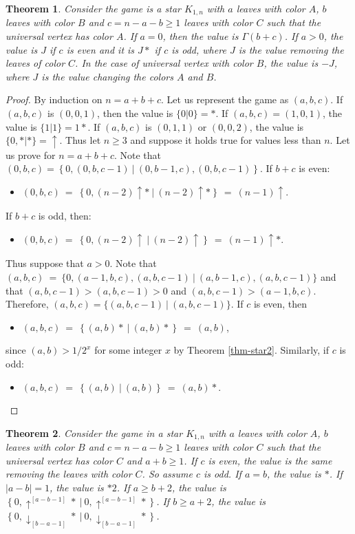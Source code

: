 \documentclass[a4paper,11pt]{article}
\newtheorem{theorem}{Theorem}
\begin{document}
\begin{theorem}\label{thm-star4}
Consider the game is a star $K_{1,n}$ with $a$ leaves with color $A$, $b$ leaves with color $B$ and $c=n-a-b\geq 1$ leaves with color $C$ such that the universal vertex has color $A$.
If $a=0$, then the value is $\Gamma(b+c)$. If $a>0$, the value is $J$ if $c$ is even and it is $J*$ if $c$ is odd, where $J$ is the value removing the leaves of color $C$.
In the case of universal vertex with color $B$, the value is $-J$, where $J$ is the value changing the colors $A$ and $B$.
\end{theorem}

\begin{proof}
By induction on $n=a+b+c$. Let us represent the game as $(a,b,c)$.
If $(a,b,c)$ is $(0,0,1)$, then the value is $\{0|0\}=*$.
If $(a,b,c)=(1,0,1)$, the value is $\{1|1\}=1*$.
If $(a,b,c)$ is $(0,1,1)$ or $(0,0,2)$, the value is $\{0,*|*\}=\uparrow$.
Thus let $n\geq 3$ and suppose it holds true for values less than $n$. Let us prove for $n=a+b+c$.
Note that $(0,b,c)=\left\{0,(0,b,c-1)\ \big|\ (0,b-1,c),(0,b,c-1)\right\}$. 
If $b+c$ is even:
\begin{itemize}
\item $(0,b,c)\ =\ \left\{0,(n-2)\uparrow *\ \big|\ (n-2)\uparrow *\right\}\ =\ (n-1)\uparrow$.
\end{itemize}
If $b+c$ is odd, then:
\begin{itemize}
\item $(0,b,c)\ =\ \left\{0,(n-2)\uparrow\ \big|\ (n-2)\uparrow\right\}\ =\ (n-1)\uparrow *$.
\end{itemize}
Thus suppose that $a>0$. Note that $(a,b,c)\ =\ \{0,(a-1,b,c),(a,b,c-1)\ \big|\ (a,b-1,c),(a,b,c-1)\}$ and that $(a,b,c-1)>(a,b,c-1)>0$ and $(a,b,c-1)>(a-1,b,c)$. Therefore, $(a,b,c)=\{(a,b,c-1)\ |\ (a,b,c-1)\}$. If $c$ is even, then
\begin{itemize}
\item $(a,b,c)\ =\ \left\{(a,b)*\ \big|\ (a,b)*\right\}\ =\ (a,b)$,
\end{itemize}
since $(a,b)>1/2^x$ for some integer $x$ by Theorem \ref{thm-star2}.
Similarly, if $c$ is odd:
\begin{itemize}
\item $(a,b,c)\ =\ \left\{(a,b)\ \big|\ (a,b)\right\}\ =\ (a,b)*$.
\end{itemize}

\end{proof}

\begin{theorem}\label{thm-star5}
Consider the game in a star $K_{1,n}$ with $a$ leaves with color $A$, $b$ leaves with color $B$ and $c=n-a-b\geq 1$ leaves with color $C$ such that the universal vertex has color $C$ and $a+b\geq 1$.
If $c$ is even, the value is the same removing the leaves with color $C$.
So assume $c$ is odd.
If $a=b$, the value is $*$. If $|a-b|=1$, the value is $*2$.
If $a\geq b+2$, the value is $\left\{0,\uparrow^{[a-b-1]}*\ \big|\ 0,\uparrow^{[a-b-1]}*\right\}$.
If $b\geq a+2$, the value is $\left\{0,\downarrow_{[b-a-1]}*\ \big|\ 0,\downarrow_{[b-a-1]}*\right\}$.
\end{theorem}
\end{document}
